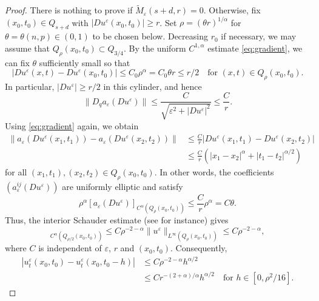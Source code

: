 \documentclass[a4paper,11pt]{amsart}
\theoremstyle{plain}
\theoremstyle{definition}
\numberwithin{equation}{section}
\begin{document}
\begin{proof}
There is nothing to prove if $\widetilde M_\varepsilon(s+d,r)=0$. Otherwise, fix $(x_0,t_0)\in Q_{s+d}$ with $|Du^\varepsilon(x_0,t_0)|\geq r$. Set $\rho=(\theta r)^{1/\alpha}$ for $\theta=\theta(n,p)\in(0,1)$ to be chosen below. Decreasing $r_0$ if necessary, we may assume that $Q_\rho(x_0,t_0)\subset Q_{3/4}$.
By the uniform $C^{1,\alpha}$ estimate \eqref{eq:gradient}, we can fix $\theta$ sufficiently small so that
\begin{equation*}
|Du^\varepsilon(x,t)-Du^\varepsilon(x_0,t_0)| \leq C_0\rho^\alpha=C_0\theta r \leq r/2 \quad\text{for }(x,t)\in Q_\rho(x_0,t_0).
\end{equation*}
In particular, $|Du^\varepsilon|\geq r/2$ in this cylinder, and hence
\begin{equation*}
\|D_q a_\varepsilon(Du^\varepsilon)\|\leq\frac{C}{\sqrt{\varepsilon^2+|Du^\varepsilon|^2}}\leq\frac Cr.
\end{equation*}
Using \eqref{eq:gradient} again, we obtain
\begin{equation*}
\begin{aligned}
\|a_\varepsilon(Du^\varepsilon(x_1,t_1))-a_\varepsilon(Du^\varepsilon(x_2,t_2))\|
&\leq\frac Cr|Du^\varepsilon(x_1,t_1)-Du^\varepsilon(x_2,t_2)|\\
&\leq\frac Cr\left(|x_1-x_2|^\alpha+|t_1-t_2|^{\alpha/2}\right)
\end{aligned}
\end{equation*}
for all $(x_1,t_1),(x_2,t_2)\in Q_\rho(x_0,t_0)$. In other words, the coefficients $(a^{ij}_{\varepsilon}(Du^{\varepsilon}))$ are uniformly elliptic and satisfy
\begin{equation*}
\rho^{\alpha}[a_\varepsilon(Du^\varepsilon)]_{C^\alpha(Q_\rho(x_0,t_0))}\leq\frac{C}{r}\rho^{\alpha}=C\theta.
\end{equation*}
Thus, the interior Schauder estimate (see \cite[Theorem~4.9]{Lie96} for instance) gives
\begin{equation*}
[u_t^\varepsilon]_{C^\alpha(Q_{\rho/2}(x_0,t_0))}
\leq C\rho^{-2-\alpha}\|u^\varepsilon\|_{L^\infty(Q_\rho(x_0,t_0))}\leq C\rho^{-2-\alpha},
\end{equation*}
where $C$ is independent of $\varepsilon$, $r$ and $(x_0,t_0)$.
Consequently,
\begin{equation}\label{eq:time-holder}
\begin{aligned}
|u_t^\varepsilon(x_0,t_0)-u_t^\varepsilon(x_0,t_0-h)|&\leq C\rho^{-2-\alpha}h^{\alpha/2}\\
&\leq Cr^{-(2+\alpha)/\alpha}h^{\alpha/2} \quad \text{for $h\in[0,\rho^2/16]$}.
\end{aligned}
\end{equation}


\end{proof}
\end{document}
